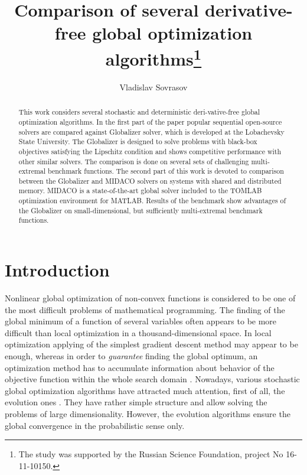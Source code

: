 \documentclass[runningheads]{llncs}
\begin{document}
%
\title{Comparison of several derivative-free global optimization algorithms\thanks{The study was supported by the Russian Science Foundation, project No 16-11-10150.}}
%
%
\author{Vladislav Sovrasov}
%
%
%
\maketitle              %
%

\begin{abstract}
This work considers several stochastic and deterministic deri-vative-free global optimization
algorithms. In the first part of the paper popular sequential open-source solvers are compared against
Globalizer solver, which is developed at the Lobachevsky State University. The Globalizer is
designed to solve problems with black-box objectives satisfying the Lipschitz condition and shows
competitive performance with other similar solvers. The comparison is done on several sets of
challenging multi-extremal benchmark functions. The second part of this work is devoted to
comparison between the Globalizer and MIDACO solvers on systems with shared and distributed
memory. MIDACO is a state-of-the-art global solver included to the TOMLAB optimization
environment for MATLAB. Results of the benchmark show advantages of the Globalizer on small-dimensional, but sufficiently multi-extremal benchmark functions.
\end{abstract}
%
\section{Introduction}

Nonlinear global optimization of non-convex functions is considered to be one of the most
difficult problems of mathematical programming. The finding of the global minimum of
a function of several variables often appears to be more difficult than local optimization in a
thousand-dimensional space. In local optimization applying of the simplest gradient descent
method may appear to be enough, whereas in order to \textit{guarantee} finding the global
optimum, an optimization method has to accumulate information about behavior of the
objective function within the whole search domain
\cite{Jones2009,Paulavicius2011,Evtushenko2013,strSergGO}. Nowadays, various stochastic global
optimization algorithms have attracted much attention, first of all, the evolution ones
\cite{Storn1997, SCHLUTER2009, KennedyEberhart1995}. They have rather simple structure
and allow solving the problems of large dimensionality. However, the evolution algorithms ensure
the global convergence in the probabilistic sense only.
\end{document}
